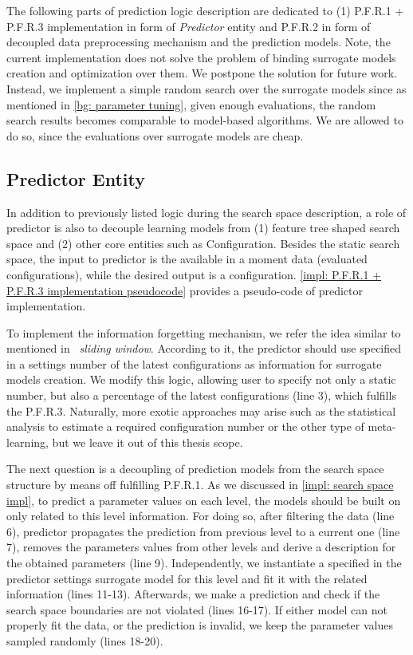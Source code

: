 The following parts of prediction logic description are dedicated to (1) P.F.R.1 + P.F.R.3 implementation in form of \emph{Predictor} entity and P.F.R.2 in form of decoupled data preprocessing mechanism and the prediction models. Note, the current implementation does not solve the problem of binding surrogate models creation and optimization over them. We postpone the solution for future work. Instead, we implement a simple random search over the surrogate models since as mentioned in \cref{bg: parameter tuning}, given enough evaluations, the random search results becomes comparable to model-based algorithms. We are allowed to do so, since the evaluations over surrogate models are cheap.

\subsection{Predictor Entity}
In addition to previously listed logic during the search space description, a role of predictor is also to decouple learning models from (1) feature tree shaped search space and (2) other core entities such as Configuration. Besides the static search space, the input to predictor is the available in a moment data (evaluated configurations), while the desired output is a configuration. \cref{impl: P.F.R.1 + P.F.R.3 implementation pseudocode} provides a pseudo-code of predictor implementation.

To implement the information forgetting mechanism, we refer the idea similar to mentioned in~\cite{ferreira2017multi} \emph{sliding window}. According to it, the predictor should use specified in a settings number of the latest configurations as information for surrogate models creation. We modify this logic, allowing user to specify not only a static number, but also a percentage of the latest configurations (line 3), which fulfills the P.F.R.3. Naturally, more exotic approaches may arise such as the statistical analysis to estimate a required configuration number or the other type of meta-learning, but we leave it out of this thesis scope.

The next question is a decoupling of prediction models from the search space structure by means off fulfilling P.F.R.1. As we discussed in \cref{impl: search space impl}, to predict a parameter values on each level, the models should be built on only related to this level information. For doing so, after filtering the data (line 6), predictor propagates the prediction from previous level to a current one (line 7), removes the parameters values from other levels and derive a description for the obtained parameters (line 9). Independently, we instantiate a specified in the predictor settings surrogate model for this level and fit it with the related information (lines 11-13). Afterwards, we make a prediction and check if the search space boundaries are not violated (lines 16-17). If either model can not properly fit the data, or the prediction is invalid, we keep the parameter values sampled randomly (lines 18-20).


